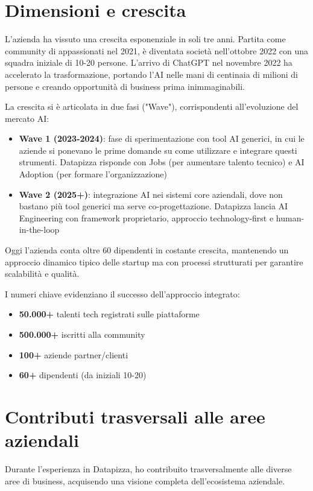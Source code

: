 \section{Dimensioni e crescita}
L'azienda ha vissuto una crescita esponenziale in soli tre anni. Partita come community di appassionati nel 2021, è diventata società nell'ottobre 2022 con una squadra iniziale di 10-20 persone. L'arrivo di ChatGPT nel novembre 2022 ha accelerato la trasformazione, portando l'AI nelle mani di centinaia di milioni di persone e creando opportunità di business prima inimmaginabili.

La crescita si è articolata in due fasi ("Wave"), corrispondenti all'evoluzione del mercato AI:
\begin{itemize}
  \item \textbf{Wave 1 (2023-2024)}: fase di sperimentazione con tool AI generici, in cui le aziende si ponevano le prime domande su come utilizzare e integrare questi strumenti. Datapizza risponde con Jobs (per aumentare talento tecnico) e AI Adoption (per formare l'organizzazione)
  
  \item \textbf{Wave 2 (2025+)}: integrazione AI nei sistemi core aziendali, dove non bastano più tool generici ma serve co-progettazione. Datapizza lancia AI Engineering con framework proprietario, approccio technology-first e human-in-the-loop
\end{itemize}

Oggi l'azienda conta oltre 60 dipendenti in costante crescita, mantenendo un approccio dinamico tipico delle startup ma con processi strutturati per garantire scalabilità e qualità.

I numeri chiave evidenziano il successo dell'approccio integrato:
\begin{itemize}
  \item \textbf{50.000+} talenti tech registrati sulle piattaforme
  \item \textbf{500.000+} iscritti alla community
  \item \textbf{100+} aziende partner/clienti
  \item \textbf{60+} dipendenti (da iniziali 10-20)
\end{itemize}

\section{Contributi trasversali alle aree aziendali}
Durante l'esperienza in Datapizza, ho contribuito trasversalmente alle diverse aree di business, acquisendo una visione completa dell'ecosistema aziendale.

